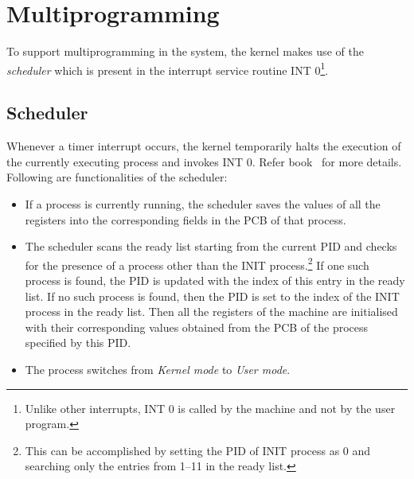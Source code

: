 \chapter{Multiprogramming}
\label{chp:multiprog}
To support multiprogramming in the system, the kernel makes use of the \emph{scheduler} which is present in the interrupt service routine INT 0\footnote{Unlike other interrupts, INT 0 is called by the machine and not by the user program.}.

\section{Scheduler}
\label{chp:scheduler}
Whenever a timer interrupt occurs, the kernel temporarily halts the execution of the currently executing process and invokes INT 0.
Refer book~\cite{Crowley} for more details.
Following are functionalities of the scheduler:
\begin{itemize}
	\item If a process is currently running, the scheduler saves the values of all the registers into the corresponding fields in the PCB of that process.
	\item The scheduler scans the ready list starting from the current PID and checks for the presence of a process other than the INIT process.\footnote{This can be accomplished by setting the PID of INIT process as 0 and searching only the entries from 1--11 in the ready list.} If one such process is found, the PID is updated with the index of this entry in the ready list. If no such process is found, then the PID is set to the index of the INIT process in the ready list. Then all the registers of the machine are initialised with their corresponding values obtained from the PCB of the process specified by this PID.
	\item The process switches from \textit{Kernel mode} to \textit{User mode}.
\end{itemize}
